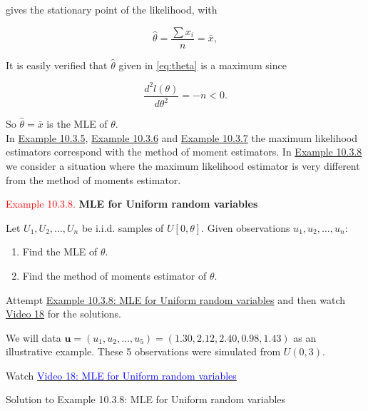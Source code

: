 \documentclass[
]{book}
\providecommand{\tightlist}{%
  \setlength{\itemsep}{0pt}\setlength{\parskip}{0pt}}
\begin{document}
gives the stationary point of the likelihood, with

\begin{equation}
\hat{\theta} = \frac{\sum x_i}{n} = \bar{x},
\label{eq:theta}  
\end{equation}

It is easily verified that \(\hat{\theta}\) given in \eqref{eq:theta} is a maximum
since

\[ \frac{d^2 l(\theta)}{d\theta^2} = -n < 0 .\]

So \(\hat{\theta}= \bar{x}\) is the MLE of \(\theta\).\\

In \protect\hyperlink{MLE:exer:bin_mle}{Example 10.3.5}, \protect\hyperlink{MLE:ex:pois_mle}{Example 10.3.6} and \protect\hyperlink{MLE:ex:normal_mean}{Example 10.3.7} the maximum likelihood estimators correspond with the method of moment estimators. In \protect\hyperlink{MLE:ex:unif_mle}{Example 10.3.8} we consider a situation where the maximum likelihood estimator is very different from the method of moments estimator.

\leavevmode{}%
\textcolor{red}{Example 10.3.8.}
{\textbf{MLE for Uniform random variables}}

Let \(U_1,U_2, \ldots, U_n\) be i.i.d. samples of \(U[0,\theta]\). Given observations \(u_1, u_2, \ldots, u_n\):

\begin{enumerate}
\def\labelenumi{(\alph{enumi})}
\tightlist
\item
  Find the MLE of \(\theta\).\\
\item
  Find the method of moments estimator of \(\theta\).
\end{enumerate}

Attempt \protect\hyperlink{MLE:exer:bin_mle}{Example 10.3.8: MLE for Uniform random variables} and then watch \protect\hyperlink{video18}{Video 18} for the solutions.

We will data \(\mathbf{u}= (u_1, u_2, \ldots, u_5)= (1.30,2.12,2.40,0.98,1.43)\) as an illustrative example. These 5 observations were simulated from \(U(0,3)\).

Watch \href{https://mediaspace.nottingham.ac.uk/media/Uniform+MLE+FINAL+VERSION/1_w4cepvo9}{\textcolor{blue}{Video 18: MLE for Uniform random variables}}

Solution to Example 10.3.8: MLE for Uniform random variables
\end{document}
